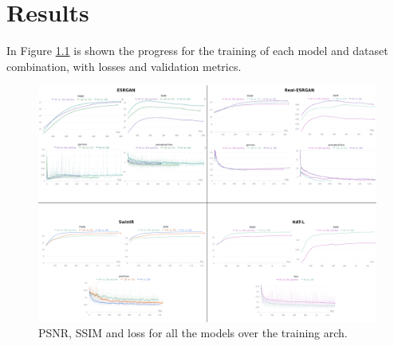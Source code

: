 \newpage
\chapter{Results}
\label{cha:Results}

In Figure \ref{img:all_training} is shown the progress for the training of each model and dataset combination, with losses and validation metrics.





\begin{figure}[H]
  \centering
  \includegraphics[scale=0.15,angle=90,origin=c]{figures/ALL_compose2.png}
  \caption{PSNR, SSIM and loss for all the models over the training arch.}
  \label{img:all_training}
\end{figure}

